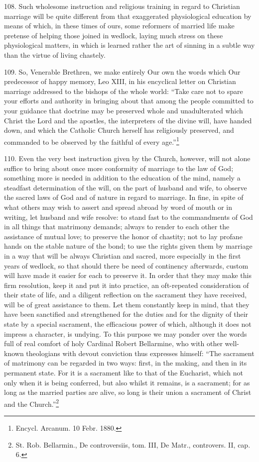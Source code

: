 \documentclass[12pt,a4paper]{book}
\begin{document}
108. Such wholesome instruction and religious training in regard to Christian marriage will be quite different from that exaggerated physiological education by means of which, in these times of ours, some reformers of married life make pretense of helping those joined in wedlock, laying much stress on these physiological matters, in which is learned rather the art of sinning in a subtle way than the virtue of living chastely.

109. So, Venerable Brethren, we make entirely Our own the words which Our predecessor of happy memory, Leo XIII, in his encyclical letter on Christian marriage addressed to the bishops of the whole world: ``Take care not to spare your efforts and authority in bringing about that among the people committed to your guidance that doctrine may be preserved whole and unadulterated which Christ the Lord and the apostles, the interpreters of the divine will, have handed down, and which the Catholic Church herself has religiously preserved, and commanded to be observed by the faithful of every age.''\footnote{Encycl. Arcanum. 10 Febr. 1880.}

110. Even the very best instruction given by the Church, however, will not alone suffice to bring about once more conformity of marriage to the law of God; something more is needed in addition to the education of the mind, namely a steadfast determination of the will, on the part of husband and wife, to observe the sacred laws of God and of nature in regard to marriage. In fine, in spite of what others may wish to assert and spread abroad by word of mouth or in writing, let husband and wife resolve: to stand fast to the commandments of God in all things that matrimony demands; always to render to each other the assistance of mutual love; to preserve the honor of chastity; not to lay profane hands on the stable nature of the bond; to use the rights given them by marriage in a way that will be always Christian and sacred, more especially in the first years of wedlock, so that should there be need of continency afterwards, custom will have made it easier for each to preserve it. In order that they may make this firm resolution, keep it and put it into practice, an oft-repeated consideration of their state of life, and a diligent reflection on the sacrament they have received, will be of great assistance to them. Let them constantly keep in mind, that they have been sanctified and strengthened for the duties and for the dignity of their state by a special sacrament, the efficacious power of which, although it does not impress a character, is undying. To this purpose we may ponder over the words full of real comfort of holy Cardinal Robert Bellarmine, who with other well-known theologians with devout conviction thus expresses himself: ``The sacrament of matrimony can be regarded in two ways: first, in the making, and then in its permanent state. For it is a sacrament like to that of the Eucharist, which not only when it is being conferred, but also whilst it remains, is a sacrament; for as long as the married parties are alive, so long is their union a sacrament of Christ and the Church.''\footnote{St. Rob. Bellarmin., De controversiis, tom. III, De Matr., controvers. II, cap. 6.}
\end{document}
